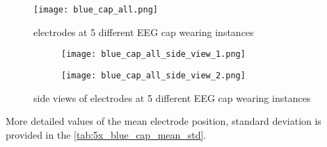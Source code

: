 \begin{figure}[hbt!]
	\centering
	\texttt{[image: blue\_cap\_all.png]}
	\caption{electrodes at 5 different EEG cap wearing instances} 
	\label{fig:blue_cap_all}
\end{figure}


\begin{figure}[hbt!]
	\centering
	\begin{subfigure}{0.49\textwidth}
		\texttt{[image: blue\_cap\_all\_side\_view\_1.png]}	
	\end{subfigure}
	\hfill
	\begin{subfigure}{0.49\textwidth}
		\texttt{[image: blue\_cap\_all\_side\_view\_2.png]}	
	\end{subfigure}
	\caption{side views of electrodes at 5 different EEG cap wearing instances} 
	\label{fig:blue_cap_all_side_view}
\end{figure} 

More detailed values of the mean electrode position, standard deviation is provided in the \cref{tab:5x_blue_cap_mean_std}.


